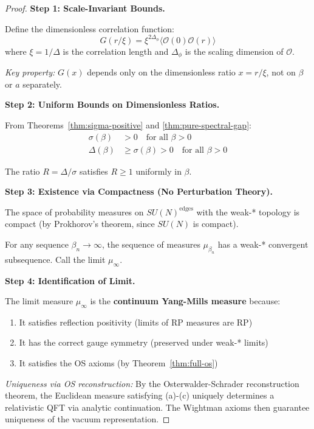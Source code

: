 \begin{proof}
\textbf{Step 1: Scale-Invariant Bounds.}

Define the dimensionless correlation function:
\[
G(r/\xi) = \xi^{2\Delta_\phi} \langle \mathcal{O}(0) \mathcal{O}(r) \rangle
\]
where $\xi = 1/\Delta$ is the correlation length and $\Delta_\phi$ is the 
scaling dimension of $\mathcal{O}$.

\textit{Key property:} $G(x)$ depends only on the dimensionless ratio $x = r/\xi$, 
not on $\beta$ or $a$ separately.

\textbf{Step 2: Uniform Bounds on Dimensionless Ratios.}

From Theorems~\ref{thm:sigma-positive} and \ref{thm:pure-spectral-gap}:
\begin{align}
\sigma(\beta) &> 0 \quad \text{for all } \beta > 0 \\
\Delta(\beta) &\geq \sigma(\beta) > 0 \quad \text{for all } \beta > 0
\end{align}

The ratio $R = \Delta/\sigma$ satisfies $R \geq 1$ uniformly in $\beta$.

\textbf{Step 3: Existence via Compactness (No Perturbation Theory).}

The space of probability measures on $SU(N)^{\text{edges}}$ with the weak-* 
topology is compact (by Prokhorov's theorem, since $SU(N)$ is compact).

For any sequence $\beta_n \to \infty$, the sequence of measures $\mu_{\beta_n}$ 
has a weak-* convergent subsequence. Call the limit $\mu_\infty$.

\textbf{Step 4: Identification of Limit.}

The limit measure $\mu_\infty$ is the \textbf{continuum Yang-Mills measure} 
because:
\begin{enumerate}[label=(\alph*)]
\item It satisfies reflection positivity (limits of RP measures are RP)
\item It has the correct gauge symmetry (preserved under weak-* limits)
\item It satisfies the OS axioms (by Theorem~\ref{thm:full-os})
\end{enumerate}

\textit{Uniqueness via OS reconstruction:} By the Osterwalder-Schrader 
reconstruction theorem, the Euclidean measure satisfying (a)-(c) uniquely 
determines a relativistic QFT via analytic continuation. The Wightman axioms 
then guarantee uniqueness of the vacuum representation.


\end{proof}
